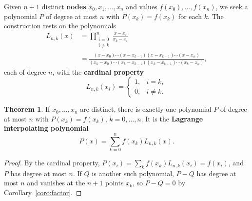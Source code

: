 \documentclass[11pt,a4paper]{article}
\numberwithin{equation}{section}
\theoremstyle{definition}
\newtheorem{thm}{Theorem}[subsection]
\begin{document}
Given $n+1$ distinct \textbf{nodes} $x_0,x_1,\dots,x_n$ and values $f(x_0),\dots,f(x_n)$, we seek a polynomial $P$ of degree at most $n$ with
$P(x_k) = f(x_k)$ for each $k$. The construction rests on the polynomials
\begin{align*}
L_{n,k}(x) &= \prod_{\substack{i = 0\\ i\neq k}}^n\frac{x-x_i}{x_k-x_i}\\
&= \frac{(x-x_0)\cdots(x-x_{k-1})(x-x_{k+1})\cdots(x-x_n)}{(x_k-x_0)\cdots(x_k-x_{k-1})(x_k-x_{k+1})\cdots(x_k-x_n)},
\end{align*}
each of degree $n$, with the \textbf{cardinal property}
$$L_{n,k}(x_i) = \begin{cases}1, & i = k,\\ 0, & i\neq k .\end{cases}$$

\begin{thm}
\label{thm:lagrange}
If $x_0,\dots,x_n$ are distinct, there is exactly one polynomial $P$ of degree at most $n$ with $P(x_k) = f(x_k)$, $k = 0,\dots,n$. It is the
\textbf{Lagrange interpolating polynomial}
$$P(x) = \sum_{k=0}^nf(x_k)L_{n,k}(x) .$$
\end{thm}

\begin{proof}
By the cardinal property, $P(x_i) = \sum_kf(x_k)L_{n,k}(x_i) = f(x_i)$, and $P$ has degree at most $n$. If $Q$ is another such polynomial,
$P-Q$ has degree at most $n$ and vanishes at the $n+1$ points $x_k$, so $P-Q = 0$ by Corollary~\ref{coro:factor}.
\end{proof}
\end{document}
